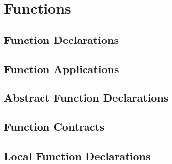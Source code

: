%
%
%
%

\chapter{Functions}

\section{Function Declarations}
\section{Function Applications}
\section{Abstract Function Declarations}
\section{Function Contracts}
\section{Local Function Declarations}
